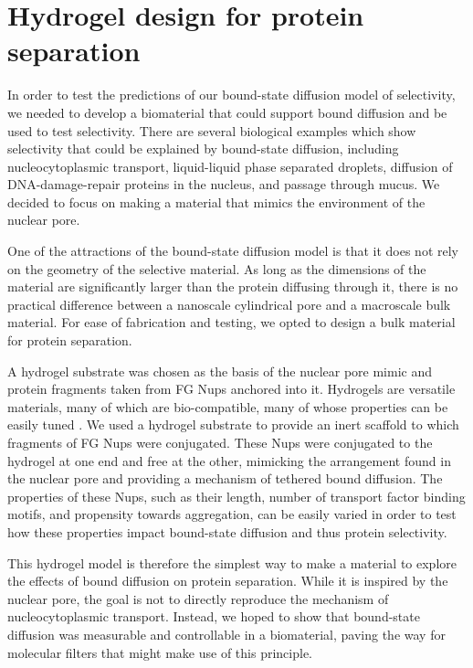 \chapter{Hydrogel design for protein separation}\label{ch03}

In order to test the predictions of our bound-state diffusion model of selectivity, we needed to develop a biomaterial that could support bound diffusion and be used to test selectivity.  There are several biological examples which show selectivity that could be explained by bound-state diffusion, including nucleocytoplasmic transport, liquid-liquid phase separated droplets, diffusion of DNA-damage-repair proteins in the nucleus, and passage through mucus\cite{zhou12,witten17,hoiby10, rudolph18}.  We decided to focus on making a material that mimics the environment of the nuclear pore.

One of the attractions of the bound-state diffusion model is that it does not rely on the geometry of the selective material.  As long as the dimensions of the material are significantly larger than the protein diffusing through it, there is no practical difference between a nanoscale cylindrical pore and a macroscale bulk material.  For ease of fabrication and testing, we opted to design a bulk material for protein separation.

A hydrogel substrate was chosen as the basis of the nuclear pore mimic and protein fragments taken from FG Nups anchored into it.  Hydrogels are versatile materials, many of which are bio-compatible, many of whose properties can be easily tuned .  We used a hydrogel substrate to provide an inert scaffold to which fragments of FG Nups were conjugated.  These Nups were conjugated to the hydrogel at one end and free at the other, mimicking the arrangement found in the nuclear pore and providing a mechanism of tethered bound diffusion.  The properties of these Nups, such as their length, number of transport factor binding motifs, and propensity towards aggregation, can be easily varied in order to test how these properties impact bound-state diffusion and thus protein selectivity.

This hydrogel model is therefore the simplest way to make a material to explore the effects of bound diffusion on protein separation.  While it is inspired by the nuclear pore, the goal is not to directly reproduce the mechanism of nucleocytoplasmic transport.  Instead, we hoped to show that bound-state diffusion was measurable and controllable in a biomaterial, paving the way for molecular filters that might make use of this principle.

